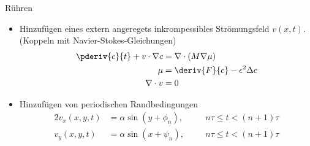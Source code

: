 \begin{frame}{Rühren}
\begin{itemize}
\item Hinzufügen eines extern angeregets inkrompessibles Strömungsfeld $v(x, t)$. (Koppeln mit Navier-Stokes-Gleichungen)
\begin{align*}
\pderiv{c}{t} + v \cdot \nabla c
&=
\nabla \cdot (M \nabla \mu)
\\
\mu
&=
\deriv{F}{c} -  \epsilon^2 \Delta c
\\
\nabla \cdot v
&=
0
\end{align*}
\item Hinzufügen von periodischen Randbedingungen
\begin{alignat*}{2}
v_x(x, y, t)
&=
\alpha \sin(y + \phi_n)
,\quad&
& n \tau \leq t < (n+1) \tau
\\
v_y(x, y, t)
&=
\alpha \sin(x + \psi_n)
,&
& n \tau \leq t < (n+1) \tau
\end{alignat*}
\end{itemize}
\end{frame}


